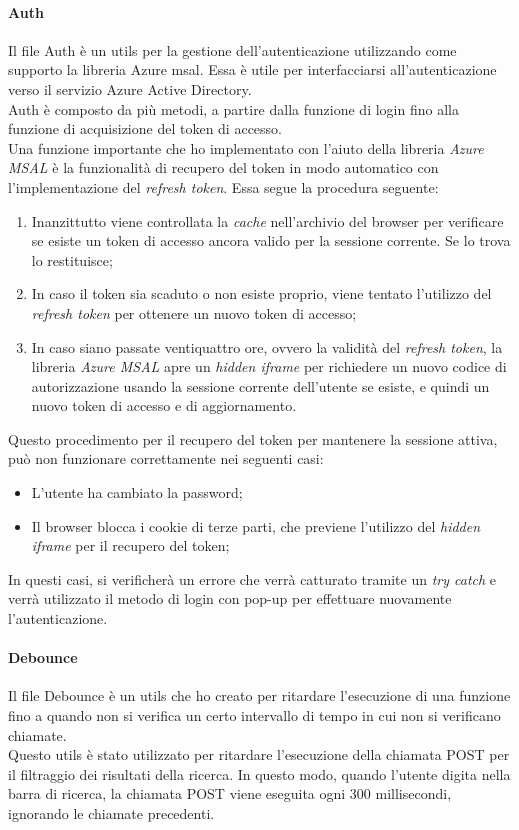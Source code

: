 \paragraph{Auth}\label{par:auth-utils}
Il file Auth è un utils per la gestione dell'autenticazione utilizzando come supporto la libreria Azure msal. Essa è utile
per interfacciarsi all'autenticazione verso il servizio Azure Active Directory.\\
Auth è composto da più metodi, a partire dalla funzione di login fino alla funzione di acquisizione del token di accesso.\\
Una funzione importante che ho implementato con l'aiuto della libreria \textit{Azure MSAL} è la funzionalità di recupero del token in modo automatico con 
l'implementazione del \textit{refresh token}. Essa segue la procedura seguente:
\begin{enumerate}
  \item Inanzittutto viene controllata la \textit{cache} nell'archivio del browser per verificare se esiste un token di accesso ancora valido per la sessione corrente. Se lo trova lo restituisce;
  \item In caso il token sia scaduto o non esiste proprio, viene tentato l'utilizzo del \textit{refresh token} per ottenere un nuovo token di accesso;
  \item In caso siano passate ventiquattro ore, ovvero la validità del \textit{refresh token}, la libreria \textit{Azure MSAL} apre un \textit{hidden iframe} per richiedere
  un nuovo codice di autorizzazione usando la sessione corrente dell'utente se esiste, e quindi un nuovo token di accesso e di aggiornamento. 
\end{enumerate}
Questo procedimento per il recupero del token per mantenere la sessione attiva, può non funzionare correttamente nei seguenti casi:
\begin{itemize}
  \item L'utente ha cambiato la password;
  \item Il browser blocca i cookie di terze parti, che previene l'utilizzo del \textit{hidden iframe} per il recupero del token;
\end{itemize}
In questi casi, si verificherà un errore che verrà catturato tramite un \textit{try catch} e verrà utilizzato il metodo di login con pop-up per effettuare nuovamente l'autenticazione.
\paragraph{Debounce}\label{par:debounce}
Il file Debounce è un utils che ho creato per ritardare l'esecuzione di una funzione fino a quando non si verifica
un certo intervallo di tempo in cui non si verificano chiamate.\\
Questo utils è stato utilizzato per ritardare l'esecuzione della chiamata POST per il filtraggio dei risultati della ricerca. 
In questo modo, quando l'utente digita nella barra di ricerca, la chiamata POST viene eseguita ogni 300 millisecondi, ignorando le chiamate precedenti.

